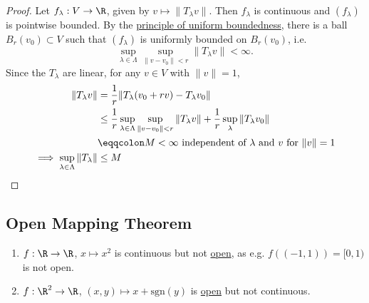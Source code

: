 \documentclass{article}
\begin{document}
\begin{proof}
    Let $f_\lambda: V \to \R$, given by $v \mapsto \|T_\lambda v\|$.
    Then $f_\lambda$ is continuous and $(f_\lambda)$ is pointwise bounded.
    By the \hyperlink{thm:pub}{principle of uniform boundedness}, there is a ball $B_r(v_0) \subset V$ such that $(f_\lambda)$ is uniformly bounded on $B_r(v_0)$, i.e.
    \begin{equation*}
        \sup_{\lambda \in \Lambda} \sup_{\|v - v_0\| < r} \|T_\lambda v\| < \infty.
    \end{equation*}
    Since the $T_\lambda$ are linear, for any $v \in V$ with $\|v\| = 1$,
    \begin{align*}
        \|T_\lambda v\| &= \frac{1}{r} \|T_\lambda(v_0 + r v) - T_\lambda v_0\| \\
                        &\leq \frac{1}{r} \sup_{\lambda \in \Lambda} \sup_{\|v - v_0\| < r} \|T_\lambda v\| + \frac{1}{r}\sup_{\lambda} \|T_\lambda v_0\| \\
                           &\eqqcolon M < \infty
                           \text{ independent of $\lambda$ and $v$ for $\|v\| = 1$} \\
        \implies \sup_{\lambda \in \Lambda} \|T_\lambda\| &\leq M \qedhere
    \end{align*}
\end{proof}

\subsection{Open Mapping Theorem}

\begin{eg}
    \leavevmode
    \begin{enumerate}[label=(\roman*)]
        \item $f:\R \to \R$, $x \mapsto x^2$ is continuous but not \hyperlink{def:openMap}{open}, as e.g. $f((-1, 1)) = [0, 1)$ is not open.
        \item $f:\R^2 \to \R$, $(x, y) \mapsto x + \mathrm{sgn}(y)$ is \hyperlink{def:openMap}{open} but not continuous.
    \end{enumerate}
\end{eg}

\end{document}
